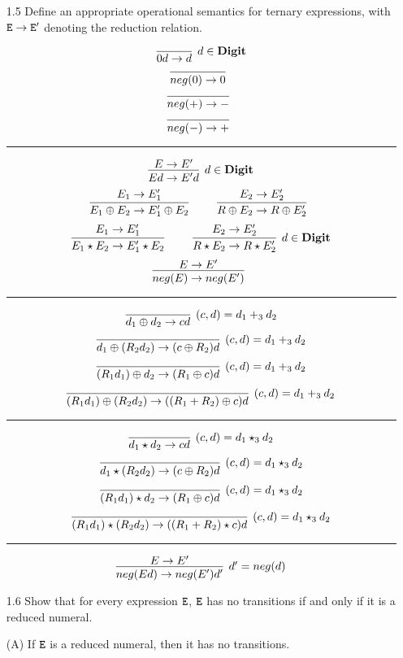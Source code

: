 \documentclass{article}
\begin{document}
\begin{enumerate}
\item[1.5] Define an appropriate operational semantics for ternary expressions, with $\mathtt{E} \to \mathtt{E}'$ denoting the reduction relation.

\[
\infer[d \in \Digit]
  {0d \rightarrow d}
  {}   
\]
\[
\infer[] 
  {neg(0) \rightarrow 0}  
  {}    
\]
\[
\infer[] 
  {neg(+) \rightarrow -}  
  {}    
\]
\[
\infer[] 
  {neg(-) \rightarrow +}  
  {}    
\]

\hrule

\[
\infer[d \in \Digit]
  {Ed \rightarrow E'd}
  {E \rightarrow E'}
\]
\[
\infer[]
  {E_{1} \oplus E_{2} \rightarrow E_{1}' \oplus E_{2}}
  {E_{1} \rightarrow E_{1}'} \qquad
\infer[]
  {R \oplus E_{2} \rightarrow R \oplus E_{2}'}
  {E_{2} \rightarrow E_{2}'}
\]
\[
\infer[]
  {E_{1} \star E_{2} \rightarrow E_{1}' \star E_{2}}
  {E_{1} \rightarrow E_{1}'} \qquad
\infer[d \in \Digit]
  {R \star E_{2} \rightarrow R \star E_{2}'}
  {E_{2} \rightarrow E_{2}'}
\]
\[
\infer[]
  {neg(E) \rightarrow neg(E')}
  {E \rightarrow E'}
\]

\hrule

\[
\infer[(c, d) = d_{1} +_3 d_{2}] 
  {d_{1} \oplus d_{2} \rightarrow cd}
  {}  
\]
\[
\infer[(c, d) = d_{1} +_3 d_{2}] 
  {d_{1} \oplus (R_{2} d_{2}) \rightarrow (c \oplus R_{2}) d}
  {}  
\]
\[
\infer[(c, d) = d_{1} +_3 d_{2}] 
  {(R_{1} d_{1}) \oplus d_{2}  \rightarrow (R_{1} \oplus c) d}
  {}  
\]
\[
\infer[(c, d) = d_{1} +_3 d_{2}] 
  {(R_{1} d_{1}) \oplus (R_{2} d_{2}) \rightarrow ((R_{1} + R_{2}) \oplus c) d}
  {}  
\]

\hrule

\[
\infer[(c, d) = d_{1} \star_{3} d_{2}] 
  {d_{1} \star d_{2} \rightarrow cd}
  {}  
\]
\[
\infer[(c, d) = d_{1} \star_{3} d_{2}] 
  {d_{1} \star (R_{2} d_{2}) \rightarrow (c \oplus R_{2}) d}
  {}  
\]
\[
\infer[(c, d) = d_{1} \star_{3} d_{2}] 
  {(R_{1} d_{1}) \star d_{2}  \rightarrow (R_{1} \oplus c) d}
  {}  
\]
\[
\infer[(c, d) = d_{1} \star_{3} d_{2}] 
  {(R_{1} d_{1}) \star (R_{2} d_{2}) \rightarrow ((R_{1} + R_{2}) \star c) d}
  {}  
\]

\hrule

\[
\infer[d' = neg(d)] 
  {neg(Ed) \rightarrow neg(E')d'}  
  {E \rightarrow E'}    
\]

\item[1.6] Show that for every expression $\mathtt{E}$, $\mathtt{E}$ has no transitions if and only if it is a reduced numeral.

(A) If $\mathtt{E}$ is a reduced numeral, then it has no transitions.


\end{enumerate}
\end{document}

